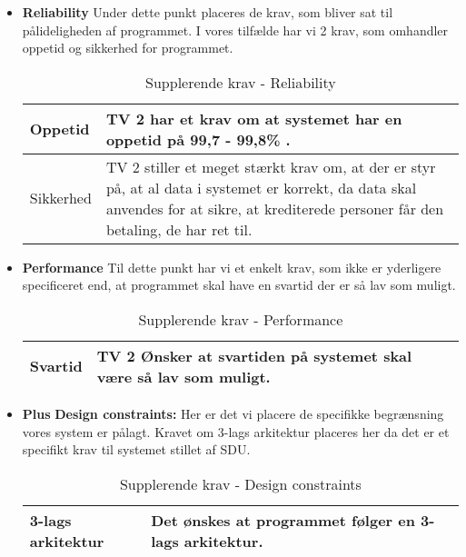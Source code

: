 \begin{itemize}
    \item \textbf{Reliability} \newline
    Under dette punkt placeres de krav, som bliver sat til pålideligheden af programmet. I vores tilfælde har vi 2 krav, som omhandler oppetid og sikkerhed for programmet. 
        \begin{table}[H]
        \centering
        \begin{tabular}{|p{30mm}|p{90mm}|}
        \hline
            Oppetid &  TV 2 har et krav om at systemet har en oppetid på 99,7 - 99,8\% .
        \\ \hline
            Sikkerhed & TV 2 stiller et meget stærkt krav om, at der er styr på, at al data i systemet er korrekt, da data skal anvendes for at sikre, at krediterede personer får den betaling, de har ret til.
        \\ \hline
        \end{tabular}
            \caption{Supplerende krav - Reliability}
            \label{tab:Reliablity}
        \end{table}
    
    \item \textbf{Performance} \newline
    Til dette punkt har vi et enkelt krav, som ikke er yderligere specificeret end, at programmet skal have en svartid der er så lav som muligt.
        \begin{table}[H]
            \centering
            \begin{tabular}{|p{30mm}|p{90mm}|}
            \hline
                Svartid & TV 2 Ønsker at svartiden på systemet skal være så lav som muligt.
            \\ \hline
            \end{tabular}
                \caption{Supplerende krav - Performance}
                \label{tab:Performance}
        \end{table}


    \item \textbf{Plus} \newline
    \textbf{Design constraints:} Her er det vi placere de specifikke begrænsning vores system er pålagt. Kravet om 3-lags arkitektur placeres her da det er et specifikt krav til systemet stillet af SDU.
        \begin{table}[H]
        \centering
            \begin{tabular}{|p{30mm}|p{90mm}|}
            \hline
                3-lags arkitektur & Det ønskes at programmet følger en 3-lags arkitektur.
            \\ \hline
            \end{tabular}
        \caption{Supplerende krav - Design constraints}
        \label{tab:Design_constraints}
        \end{table}
        

\end{itemize}

